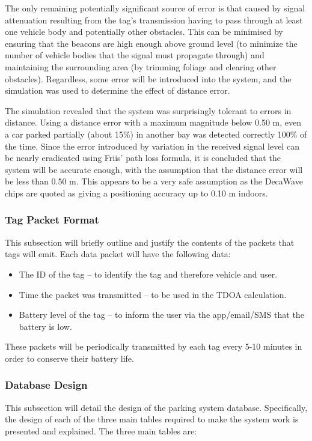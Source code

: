 The only remaining potentially significant source of error is that caused by signal attenuation resulting from the tag's transmission having to pass through at least one vehicle body and potentially other obstacles. This can be minimised by ensuring that the beacons are high enough above ground level (to minimize the number of vehicle bodies that the signal must propagate through) and maintaining the surrounding area (by trimming foliage and clearing other obstacles). Regardless, some error will be introduced into the system, and the simulation was used to determine the effect of distance error.

The simulation revealed that the system was surprisingly tolerant to errors in distance. Using a distance error with a maximum magnitude below 0.50 m, even a car parked partially (about 15\%) in another bay was detected correctly 100\% of the time. Since the error introduced by variation in the received signal level can be nearly eradicated using Friis' path loss formula, it is concluded that the system will be accurate enough, with the assumption that the distance error will be less than 0.50 m. This appears to be a very safe assumption as the DecaWave chips are quoted as giving a positioning accuracy up to 0.10 m indoors.\cite{3}

\newpage
\subsubsection{Tag Packet Format} \label{tag-packet}
This subsection will briefly outline and justify the contents of the packets that tags will emit. Each data packet will have the following data:

\begin{itemize}
\item The ID of the tag – to identify the tag and therefore vehicle and user.
\item Time the packet was transmitted – to be used in the TDOA calculation.
\item Battery level of the tag – to inform the user via the app/email/SMS that the battery is low.
\end{itemize}

These packets will be periodically transmitted by each tag every 5-10 minutes in order to conserve their battery life.

\subsubsection{Database Design}
This subsection will detail the design of the parking system database. Specifically, the design of each of the three main tables required to make the system work is presented and explained. The three main tables are:

